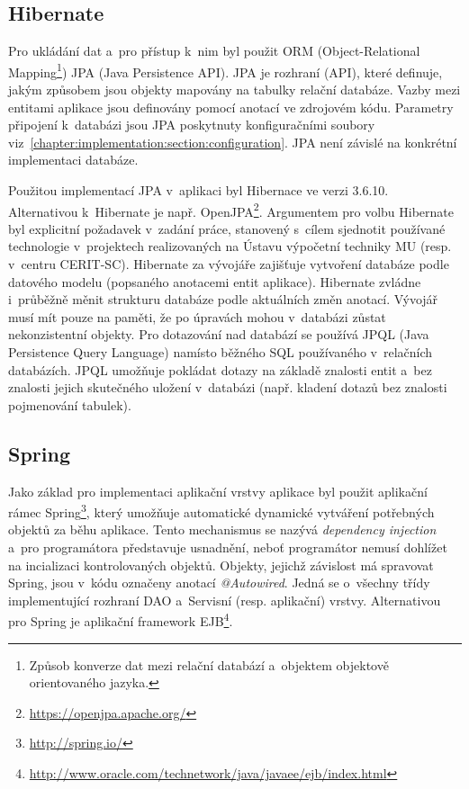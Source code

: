 \documentclass[11pt, final, oneside]{fithesis2}
\begin{document}
\subsection{Hibernate}
Pro ukládání dat a~pro přístup k~nim byl použit ORM (Object-Relational Mapping\footnote{Způsob konverze dat mezi relační databází a~objektem objektově orientovaného jazyka.}) JPA (Java Persistence API). JPA je rozhraní (API), které definuje, jakým způsobem jsou objekty mapovány na tabulky relační databáze. Vazby mezi entitami aplikace jsou definovány pomocí anotací ve zdrojovém kódu. Parametry připojení k~databázi jsou JPA poskytnuty konfiguračními soubory viz~\ref{chapter:implementation:section:configuration}. JPA není závislé na konkrétní implementaci databáze.

Použitou implementací JPA v~aplikaci byl Hibernace ve verzi 3.6.10. Alternativou k~Hibernate je např. OpenJPA\footnote{\url{https://openjpa.apache.org/}}. Argumentem pro volbu Hibernate byl explicitní požadavek v~zadání práce, stanovený s~cílem sjednotit používané technologie v~projektech realizovaných na Ústavu výpočetní techniky MU (resp. v~centru CERIT-SC). 
Hibernate za vývojáře zajišťuje vytvoření databáze podle datového modelu (popsaného anotacemi entit aplikace). Hibernate zvládne i~průběžně měnit strukturu databáze podle aktuálních změn anotací. Vývojář musí mít pouze na paměti, že po úpravách mohou v~databázi zůstat nekonzistentní objekty.
Pro dotazování nad databází se používá JPQL (Java Persistence Query Language) namísto běžného SQL používaného v~relačních databázích. JPQL umožňuje pokládat dotazy na základě znalosti entit a~bez znalosti jejich skutečného uložení v~databázi (např. kladení dotazů bez znalosti pojmenování tabulek).

\subsection{Spring}
Jako základ pro implementaci aplikační vrstvy aplikace byl použit aplikační rámec Spring\footnote{\url{http://spring.io/}}, který umožňuje automatické dynamické vytváření potřebných objektů za běhu aplikace. Tento mechanismus se nazývá \textit{dependency injection} a~pro programátora představuje usnadnění, neboť programátor nemusí dohlížet na incializaci kontrolovaných objektů. Objekty, jejichž závislost má spravovat Spring, jsou v~kódu označeny anotací \textit{@Autowired}. Jedná se o~všechny třídy implementující rozhraní DAO a~Servisní (resp. aplikační) vrstvy.
Alternativou pro Spring je aplikační framework EJB\footnote{\url{http://www.oracle.com/technetwork/java/javaee/ejb/index.html}}.
\end{document}
